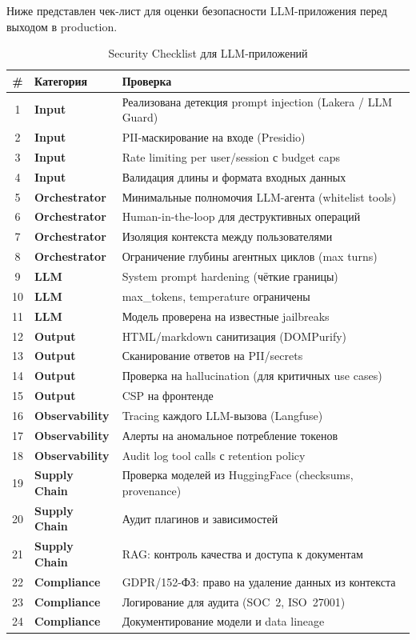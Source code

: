 \documentclass[12pt,a4paper]{article}
\begin{document}
Ниже представлен чек-лист для оценки безопасности LLM-приложения перед выходом в production.

\begin{table}[H]
\centering
\small
\renewcommand{\arraystretch}{1.25}
\begin{tabularx}{\textwidth}{c >{\bfseries}l X}
\toprule
\# & Категория & Проверка \\
\midrule
1 & Input & Реализована детекция prompt injection (Lakera / LLM Guard) \\
2 & Input & PII-маскирование на входе (Presidio) \\
3 & Input & Rate limiting per user/session с budget caps \\
4 & Input & Валидация длины и формата входных данных \\
\midrule
5 & Orchestrator & Минимальные полномочия LLM-агента (whitelist tools) \\
6 & Orchestrator & Human-in-the-loop для деструктивных операций \\
7 & Orchestrator & Изоляция контекста между пользователями \\
8 & Orchestrator & Ограничение глубины агентных циклов (max turns) \\
\midrule
9 & LLM & System prompt hardening (чёткие границы) \\
10 & LLM & max\_tokens, temperature ограничены \\
11 & LLM & Модель проверена на известные jailbreaks \\
\midrule
12 & Output & HTML/markdown санитизация (DOMPurify) \\
13 & Output & Сканирование ответов на PII/secrets \\
14 & Output & Проверка на hallucination (для критичных use cases) \\
15 & Output & CSP на фронтенде \\
\midrule
16 & Observability & Tracing каждого LLM-вызова (Langfuse) \\
17 & Observability & Алерты на аномальное потребление токенов \\
18 & Observability & Audit log tool calls с retention policy \\
\midrule
19 & Supply Chain & Проверка моделей из HuggingFace (checksums, provenance) \\
20 & Supply Chain & Аудит плагинов и зависимостей \\
21 & Supply Chain & RAG: контроль качества и доступа к документам \\
\midrule
22 & Compliance & GDPR/152-ФЗ: право на удаление данных из контекста \\
23 & Compliance & Логирование для аудита (SOC~2, ISO~27001) \\
24 & Compliance & Документирование модели и data lineage \\
\bottomrule
\end{tabularx}
\caption{Security Checklist для LLM-приложений}
\label{tab:checklist}
\end{table}
\end{document}
